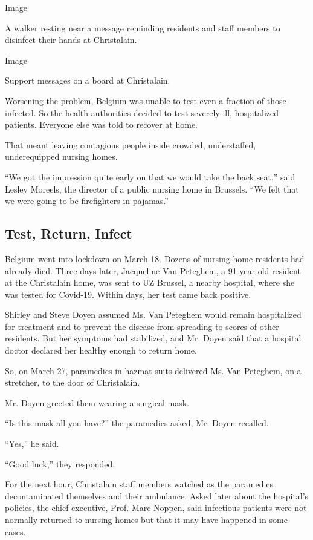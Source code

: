 Image

A walker resting near a message reminding residents and staff members to
disinfect their hands at Christalain.

Image

Support messages on a board at Christalain.

Worsening the problem, Belgium was unable to test even a fraction of
those infected. So the health authorities decided to test severely ill,
hospitalized patients. Everyone else was told to recover at home.

That meant leaving contagious people inside crowded, understaffed,
underequipped nursing homes.

``We got the impression quite early on that we would take the back
seat,'' said Lesley Moreels, the director of a public nursing home in
Brussels. ``We felt that we were going to be firefighters in pajamas.''

\hypertarget{test-return-infect}{%
\subsection{Test, Return, Infect}\label{test-return-infect}}

Belgium went into lockdown on March 18. Dozens of nursing-home residents
had already died. Three days later, Jacqueline Van Peteghem, a
91-year-old resident at the Christalain home, was sent to UZ Brussel, a
nearby hospital, where she was tested for Covid-19. Within days, her
test came back positive.

Shirley and Steve Doyen assumed Ms. Van Peteghem would remain
hospitalized for treatment and to prevent the disease from spreading to
scores of other residents. But her symptoms had stabilized, and Mr.
Doyen said that a hospital doctor declared her healthy enough to return
home.

So, on March 27, paramedics in hazmat suits delivered Ms. Van Peteghem,
on a stretcher, to the door of Christalain.

Mr. Doyen greeted them wearing a surgical mask.

``Is this mask all you have?'' the paramedics asked, Mr. Doyen recalled.

``Yes,'' he said.

``Good luck,'' they responded.

For the next hour, Christalain staff members watched as the paramedics
decontaminated themselves and their ambulance. Asked later about the
hospital's policies, the chief executive, Prof. Marc Noppen, said
infectious patients were not normally returned to nursing homes but that
it may have happened in some cases.

